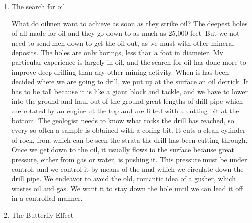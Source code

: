 \begin{enumerate}
\item The search for oil

What do oilmen want to achieve as soon as they strike oil? The deepest holes of all made for oil and they go down to as much as 25,000 feet.
But we not need to send men down to get the oil out, as we must with other mineral deposits.
The holes are only borings, less than a foot in diameter.
My particular experience is largely in oil, and the search for oil has done more to improve deep drilling than any other mining activity.
When is has been decided where we are going to drill, we put up at the surface an oil derrick.
It has to be tall because it is like a giant block and tackle, and we have to lower into the ground and haul out of the ground great lengths of drill pipe which are rotated by an engine at the top and are fitted with a cutting bit at the bottom.
The geologist needs to know what rocks the drill has reached, so every so often a sample is obtained with a coring bit.
It cuts a clean cylinder of rock, from which can be seen the strata the drill has been cutting through.
Once we get down to the oil, it usually flows to the surface because great pressure, either from gas or water, is pushing it.
This pressure must be under control, and we control it by means of the mud which we circulate down the drill pipe.
We endeavor to avoid the old, romantic idea of a gusher, which wastes oil and gas.
We want it to stay down the hole until we can lead it off in a controlled manner.
                                                                                                                         
                                                                                                                          
\item The Butterfly Effect


\end{enumerate}
